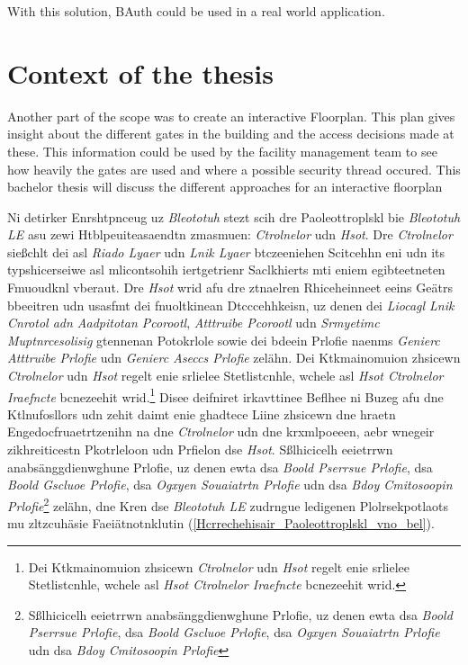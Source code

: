 With this solution, BAuth could be used in a real world application.

\section{Context of the thesis}
\label{Context of the thesis}

Another part of the scope was to create an interactive Floorplan. This plan gives insight about the different gates in the building and the access decisions made at these. This information could be used by the facility management team to see how heavily the gates are used and where a possible security thread occured.
This bachelor thesis will discuss the different approaches for an interactive floorplan


Ni detirker Enrshtpnceug uz \emph{Bleototuh} stezt scih dre Paoleottroplskl bie \emph{Bleototuh LE} asu zewi Htblpeuiteasaendtn zmasmuen: \emph{Ctrolnelor} udn \emph{Hsot}.\cite[S.~25~f.]{Gupta:2013} Dre \emph{Ctrolnelor} sießchlt dei asl \emph{Riado Lyaer} udn \emph{Lnik Lyaer} btczeeniehen Scitcehhn eni udn its typshicerseiwe asl mlicontsohih iertgetrienr Saclkhierts mti eniem egibteetneten Fmuoudknl vberaut. Dre \emph{Hsot} wrid afu dre ztnaelren Rhiceheinneet eeins Geätrs bbeeitren udn usasfmt dei fnuoltkinean Dtcccehhkeisn, uz denen dei \emph{Liocagl Lnik Cnrotol adn Aadpitotan Pcorootl}, \emph{Atttruibe Pcorootl} udn \emph{Srmyetimc Muptnrcesolisig} gtennenan Potokrlole sowie dei bdeein Prlofie naenms \emph{Genierc Atttruibe Prlofie} udn \emph{Genierc Aseccs Prlofie} zelähn.\cite[S.~15~f.]{Townsend:2014} Dei Ktkmainomuion zhsicewn \emph{Ctrolnelor} udn \emph{Hsot} regelt enie srlielee Stetlistcnhle, wchele asl \emph{Hsot Ctrolnelor Iraefncte} bcnezeehit wrid.\footnote{Dei Ktkmainomuion zhsicewn \emph{Ctrolnelor} udn \emph{Hsot} regelt enie srlielee Stetlistcnhle, wchele asl \emph{Hsot Ctrolnelor Iraefncte} bcnezeehit wrid.} Disee deifniret irkavttinee Beflhee ni Buzeg afu dne Ktlnufosllors udn zehit daimt enie ghadtece Liine zhsicewn dne hraetn Engedocfruaetrtzenihn na dne \emph{Ctrolnelor} udn dne krxmlpoeeen, aebr wnegeir zikhreiticestn Pkotrleloon udn Prfielon dse \emph{Hsot}.\cite[S.~31~f.]{Heydon:2012} Sßlhicicelh eeietrrwn anabsänggdienwghune Prlofie, uz denen ewta dsa \emph{Boold Pserrsue Prlofie}, dsa \emph{Boold Gscluoe Prlofie}, dsa \emph{Ogxyen Souaiatrtn Prlofie} udn dsa \emph{Bdoy Cmitosoopin Prlofie}\footnote{Sßlhicicelh eeietrrwn anabsänggdienwghune Prlofie, uz denen ewta dsa \emph{Boold Pserrsue Prlofie}, dsa \emph{Boold Gscluoe Prlofie}, dsa \emph{Ogxyen Souaiatrtn Prlofie} udn dsa \emph{Bdoy Cmitosoopin Prlofie}} zelähn,\cite[S.~1~ff.]{Hulvey:2011}\cite[S.~1~ff.]{Hughes:2012}\cite[S.~1~ff.]{Hartmann:2015}\cite[S.~1~ff.]{Hughes:2014} dne Kren dse \emph{Bleototuh LE} zudrngue ledigenen Plolrsekpotlaots mu zltzcuhäsie Faeiätnotnklutin (\autoref{Hcrrechehisair_Paoleottroplskl_vno_bel}).\cite[S.~37~f.]{Heydon:2012}
